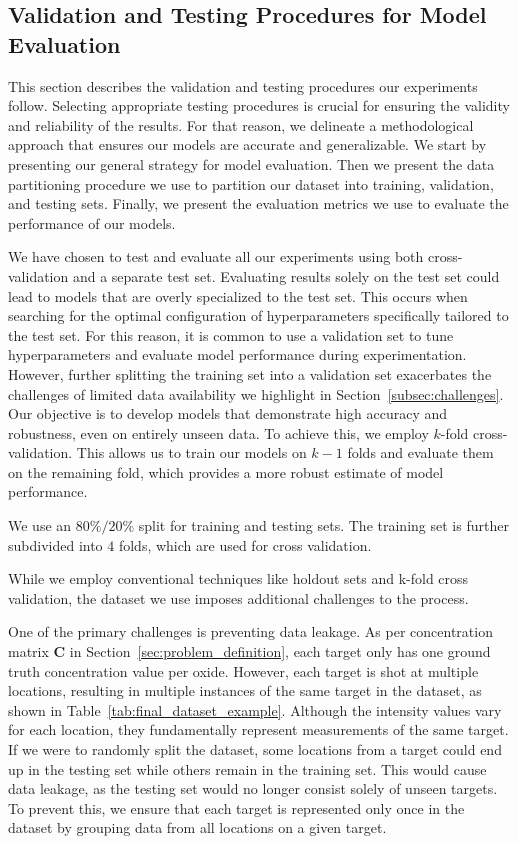 \subsection{Validation and Testing Procedures for Model Evaluation}\label{subsec:validation_testing_procedures}
This section describes the validation and testing procedures our experiments follow.
Selecting appropriate testing procedures is crucial for ensuring the validity and reliability of the results.
For that reason, we delineate a methodological approach that ensures our models are accurate and generalizable.
We start by presenting our general strategy for model evaluation.
Then we present the data partitioning procedure we use to partition our dataset into training, validation, and testing sets.
Finally, we present the evaluation metrics we use to evaluate the performance of our models.

We have chosen to test and evaluate all our experiments using both cross-validation and a separate test set.
Evaluating results solely on the test set could lead to models that are overly specialized to the test set.
This occurs when searching for the optimal configuration of hyperparameters specifically tailored to the test set.
For this reason, it is common to use a validation set to tune hyperparameters and evaluate model performance during experimentation.
However, further splitting the training set into a validation set exacerbates the challenges of limited data availability we highlight in Section~\ref{subsec:challenges}.
Our objective is to develop models that demonstrate high accuracy and robustness, even on entirely unseen data.
To achieve this, we employ $k$-fold cross-validation.
This allows us to train our models on $k-1$ folds and evaluate them on the remaining fold, which provides a more robust estimate of model performance.

We use an $80\%/20\%$ split for training and testing sets. The training set is further subdivided into $4$ folds, which are used for cross validation.

While we employ conventional techniques like holdout sets and k-fold cross validation, the dataset we use imposes additional challenges to the process.

One of the primary challenges is preventing data leakage.
As per concentration matrix $\mathbf{C}$ in Section~\ref{sec:problem_definition}, each target only has one ground truth concentration value per oxide.
However, each target is shot at multiple locations, resulting in multiple instances of the same target in the dataset, as shown in Table~\ref{tab:final_dataset_example}.
Although the intensity values vary for each location, they fundamentally represent measurements of the same target.
If we were to randomly split the dataset, some locations from a target could end up in the testing set while others remain in the training set.
This would cause data leakage, as the testing set would no longer consist solely of unseen targets.
To prevent this, we ensure that each target is represented only once in the dataset by grouping data from all locations on a given target.

